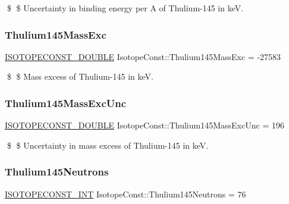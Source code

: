\$ \$ Uncertainty in binding energy per A of Thulium-\/145 in keV. \mbox{\label{group___isotope_const-_thulium-_tm145_gacb991bb8387f230144bf6b84ce92b4cf}} 
\subsubsection{\texorpdfstring{Thulium145\+Mass\+Exc}{Thulium145MassExc}}
{\footnotesize\ttfamily \mbox{\hyperlink{group___isotope_const-_macros_ga8f45a7272ce02c0b4c65c44636ed719a}{I\+S\+O\+T\+O\+P\+E\+C\+O\+N\+S\+T\+\_\+\+D\+O\+U\+B\+LE}} Isotope\+Const\+::\+Thulium145\+Mass\+Exc = -\/27583}

\$ \$ Mass excess of Thulium-\/145 in keV. \mbox{\label{group___isotope_const-_thulium-_tm145_gad4a2377c43d3e2cc2a08d524f3d98e11}} 
\subsubsection{\texorpdfstring{Thulium145\+Mass\+Exc\+Unc}{Thulium145MassExcUnc}}
{\footnotesize\ttfamily \mbox{\hyperlink{group___isotope_const-_macros_ga8f45a7272ce02c0b4c65c44636ed719a}{I\+S\+O\+T\+O\+P\+E\+C\+O\+N\+S\+T\+\_\+\+D\+O\+U\+B\+LE}} Isotope\+Const\+::\+Thulium145\+Mass\+Exc\+Unc = 196}

\$ \$ Uncertainty in mass excess of Thulium-\/145 in keV. \mbox{\label{group___isotope_const-_thulium-_tm145_ga652357673dfba717d0e02316a585dedf}} 
\subsubsection{\texorpdfstring{Thulium145\+Neutrons}{Thulium145Neutrons}}
{\footnotesize\ttfamily \mbox{\hyperlink{group___isotope_const-_macros_ga5f18360b3e99483a35c32d789e62621c}{I\+S\+O\+T\+O\+P\+E\+C\+O\+N\+S\+T\+\_\+\+I\+NT}} Isotope\+Const\+::\+Thulium145\+Neutrons = 76}

